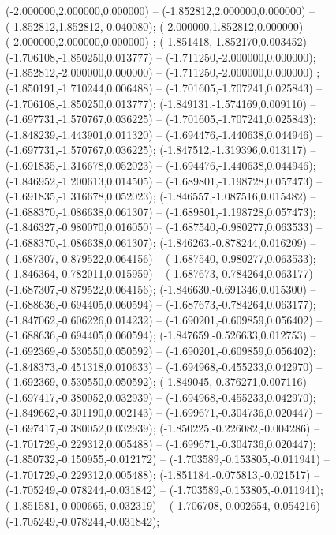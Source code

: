  (-2.000000,2.000000,0.000000) -- (-1.852812,2.000000,0.000000) -- (-1.852812,1.852812,-0.040080);
 (-2.000000,1.852812,0.000000) -- (-2.000000,2.000000,0.000000) ;
 (-1.851418,-1.852170,0.003452) -- (-1.706108,-1.850250,0.013777) -- (-1.711250,-2.000000,0.000000);
 (-1.852812,-2.000000,0.000000) -- (-1.711250,-2.000000,0.000000) ;
 (-1.850191,-1.710244,0.006488) -- (-1.701605,-1.707241,0.025843) -- (-1.706108,-1.850250,0.013777);
 (-1.849131,-1.574169,0.009110) -- (-1.697731,-1.570767,0.036225) -- (-1.701605,-1.707241,0.025843);
 (-1.848239,-1.443901,0.011320) -- (-1.694476,-1.440638,0.044946) -- (-1.697731,-1.570767,0.036225);
 (-1.847512,-1.319396,0.013117) -- (-1.691835,-1.316678,0.052023) -- (-1.694476,-1.440638,0.044946);
 (-1.846952,-1.200613,0.014505) -- (-1.689801,-1.198728,0.057473) -- (-1.691835,-1.316678,0.052023);
 (-1.846557,-1.087516,0.015482) -- (-1.688370,-1.086638,0.061307) -- (-1.689801,-1.198728,0.057473);
 (-1.846327,-0.980070,0.016050) -- (-1.687540,-0.980277,0.063533) -- (-1.688370,-1.086638,0.061307);
 (-1.846263,-0.878244,0.016209) -- (-1.687307,-0.879522,0.064156) -- (-1.687540,-0.980277,0.063533);
 (-1.846364,-0.782011,0.015959) -- (-1.687673,-0.784264,0.063177) -- (-1.687307,-0.879522,0.064156);
 (-1.846630,-0.691346,0.015300) -- (-1.688636,-0.694405,0.060594) -- (-1.687673,-0.784264,0.063177);
 (-1.847062,-0.606226,0.014232) -- (-1.690201,-0.609859,0.056402) -- (-1.688636,-0.694405,0.060594);
 (-1.847659,-0.526633,0.012753) -- (-1.692369,-0.530550,0.050592) -- (-1.690201,-0.609859,0.056402);
 (-1.848373,-0.451318,0.010633) -- (-1.694968,-0.455233,0.042970) -- (-1.692369,-0.530550,0.050592);
 (-1.849045,-0.376271,0.007116) -- (-1.697417,-0.380052,0.032939) -- (-1.694968,-0.455233,0.042970);
 (-1.849662,-0.301190,0.002143) -- (-1.699671,-0.304736,0.020447) -- (-1.697417,-0.380052,0.032939);
 (-1.850225,-0.226082,-0.004286) -- (-1.701729,-0.229312,0.005488) -- (-1.699671,-0.304736,0.020447);
 (-1.850732,-0.150955,-0.012172) -- (-1.703589,-0.153805,-0.011941) -- (-1.701729,-0.229312,0.005488);
 (-1.851184,-0.075813,-0.021517) -- (-1.705249,-0.078244,-0.031842) -- (-1.703589,-0.153805,-0.011941);
 (-1.851581,-0.000665,-0.032319) -- (-1.706708,-0.002654,-0.054216) -- (-1.705249,-0.078244,-0.031842);
